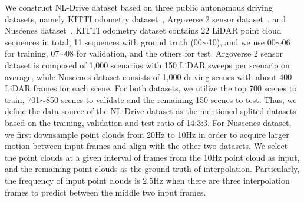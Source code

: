 \documentclass[10pt,twocolumn,letterpaper]{article}
\begin{document}
We construct NL-Drive dataset based on three public autonomous driving datasets, namely KITTI odometry dataset~\cite{geiger2012we}, Argoverse 2 sensor dataset~\cite{chang2019argoverse}, and Nuscenes dataset~\cite{caesar2020nuscenes}. KITTI odometry dataset contains 22 LiDAR point cloud sequences in total, 11 sequences with ground truth (00$\sim$10), and we use 00$\sim$06 for training, 07$\sim$08 for validation, and the others for test. Argoverse 2 sensor dataset is composed of 1,000 scenarios with 150 LiDAR sweeps per scenario on average, while Nuscenes dataset consists of 1,000 driving scenes with about 400 LiDAR frames for each scene. For both datasets, we utilize the top 700 scenes to train, 701$\sim$850 scenes to validate and the remaining 150 scenes to test. Thus, we define the data source of the NL-Drive dataset as the mentioned splited datasets based on the training, validation and test ratio of 14:3:3. For Nuscenes dataset, we first downsample point clouds from 20Hz to 10Hz in order to acquire larger motion between input frames and align with the other two datasets. We select the point clouds at a given interval of frames from the 10Hz point cloud as input, and the remaining point clouds as the ground truth of interpolation. Particularly, the frequency of input point clouds is 2.5Hz when there are three interpolation frames to predict between the middle two input frames. 
\end{document}
